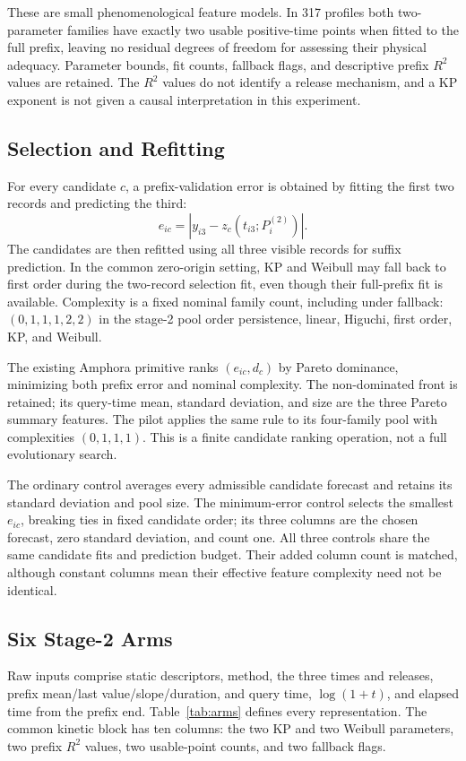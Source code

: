 \documentclass[conference,letterpaper]{IEEEtran}
\begin{document}
These are small phenomenological feature models. In 317 profiles both two-parameter families have exactly two usable positive-time points when fitted to the full prefix, leaving no residual degrees of freedom for assessing their physical adequacy. Parameter bounds, fit counts, fallback flags, and descriptive prefix $R^2$ values are retained. The $R^2$ values do not identify a release mechanism, and a KP exponent is not given a causal interpretation in this experiment.

\subsection{Selection and Refitting}
For every candidate $c$, a prefix-validation error is obtained by fitting the first two records and predicting the third:
\begin{equation}
 e_{ic}=|y_{i3}-z_c(t_{i3};P_i^{(2)})|.
\end{equation}
The candidates are then refitted using all three visible records for suffix prediction. In the common zero-origin setting, KP and Weibull may fall back to first order during the two-record selection fit, even though their full-prefix fit is available. Complexity is a fixed nominal family count, including under fallback: $(0,1,1,1,2,2)$ in the stage-2 pool order persistence, linear, Higuchi, first order, KP, and Weibull.

The existing Amphora primitive ranks $(e_{ic},d_c)$ by Pareto dominance, minimizing both prefix error and nominal complexity. The non-dominated front is retained; its query-time mean, standard deviation, and size are the three Pareto summary features. The pilot applies the same rule to its four-family pool with complexities $(0,1,1,1)$. This is a finite candidate ranking operation, not a full evolutionary search.

The ordinary control averages every admissible candidate forecast and retains its standard deviation and pool size. The minimum-error control selects the smallest $e_{ic}$, breaking ties in fixed candidate order; its three columns are the chosen forecast, zero standard deviation, and count one. All three controls share the same candidate fits and prediction budget. Their added column count is matched, although constant columns mean their effective feature complexity need not be identical.

\subsection{Six Stage-2 Arms}
Raw inputs comprise static descriptors, method, the three times and releases, prefix mean/last value/slope/duration, and query time, $\log(1+t)$, and elapsed time from the prefix end. Table~\ref{tab:arms} defines every representation. The common kinetic block has ten columns: the two KP and two Weibull parameters, two prefix $R^2$ values, two usable-point counts, and two fallback flags.
\end{document}
